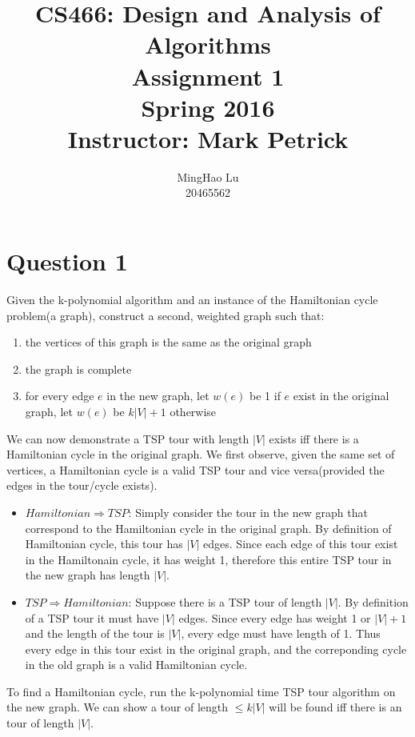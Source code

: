 \documentclass{article}
\title{CS466: Design and Analysis of Algorithms \\ Assignment 1 \\ Spring 2016 \\ Instructor: Mark Petrick}
\author{MingHao Lu \\ 20465562}
\begin{document}
    \maketitle
    \newpage

\section*{Question 1}

    Given the k-polynomial algorithm and an instance of the Hamiltonian 
    cycle problem(a graph), construct a second, weighted graph such that:
    \begin{enumerate}
        \item the vertices of this graph is the same as the original graph
        \item the graph is complete
        \item for every edge $e$ in the new graph, let $w(e)$ be 1 if $e$ exist in the original graph, 
            let $w(e)$ be $k|V|+1$ otherwise
    \end{enumerate}

    We can now demonstrate a TSP tour with length $|V|$ exists iff there is a
    Hamiltonian cycle in the original graph. We first observe, given the same set of vertices,
    a Hamiltonian cycle is a valid TSP tour and vice versa(provided the edges in the tour/cycle exists). 
    \begin{itemize}
        \item $Hamiltonian \Rightarrow TSP$: Simply consider the tour in the new graph that 
            correspond to the Hamiltonian cycle in the original graph. By definition 
            of Hamiltonian cycle, this tour has $|V|$ edges. Since each edge of this 
            tour exist in the Hamiltonain cycle, it has weight 1, therefore this entire TSP 
            tour in the new graph has length $|V|$.
        \item $TSP \Rightarrow Hamiltonian$: Suppose there is a TSP tour of length $|V|$. By definition
            of a TSP tour it must have $|V|$ edges. Since every edge has weight 1 or $|V|+1$ 
            and the length of the tour is $|V|$, every edge must have length of 1. Thus every edge in
            this tour exist in the original graph, and the correponding cycle in the old graph is a valid
            Hamiltonian cycle.
    \end{itemize}

    To find a Hamiltonian cycle, run the k-polynomial time TSP tour algorithm on the new graph. We can show
    a tour of length $\le k|V|$ will be found iff there is an tour of length $|V|$. 
\end{document}
